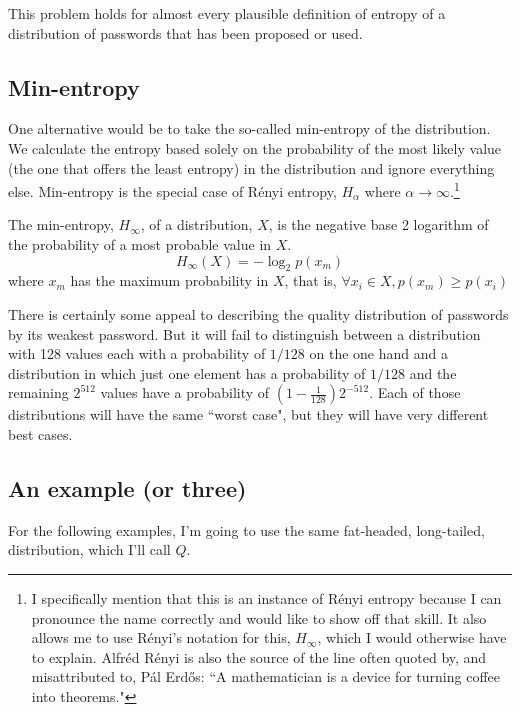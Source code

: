 \documentclass[12pt]{article}
\begin{document}
This problem holds for almost every plausible definition of entropy of a distribution of passwords that has been proposed or used.

\subsection{Min-entropy}

One alternative would be to take the so-called min-entropy of the distribution. We calculate the entropy based solely on the probability of the most likely value (the one that offers the least entropy) in the distribution and ignore everything else.  Min-entropy is the special case of Rényi entropy, $H_\alpha$ where $\alpha \to \infty$.\footnote{I specifically mention that this is an instance of R\'enyi entropy \parencite{Renyi:1960} because I can pronounce the name correctly and would like to show off that skill. It also allows me to use Rényi's notation for this, $H_\infty$, which I would otherwise have to explain. Alfréd Rényi is also the source of the line often quoted by, and misattributed to, Pál Erdős: ``A mathematician is a device for turning coffee into theorems."}

\begin{Definition}\label{def:minH}
The min-entropy, $H_\infty$, of a distribution, $X$, is the negative base 2 logarithm of the probability of a most probable value in $X$.
$$
H_\infty(X) = -\log_2 p(x_m)
$$
where $x_m$ has the maximum probability in $X$, that is, $\forall x_i \in X, p(x_m) \geq p(x_i)$
\end{Definition}

There is certainly some appeal to describing the quality distribution of passwords by its weakest password. But it will fail to distinguish between a distribution with 128 values each with a probability of $1/128$ on the one hand and a distribution in which just one element has a probability of $1/128$ and the remaining $2^{512}$ values have a probability of $(1-\frac{1}{128})2^{-512}$. Each of those distributions will have the same ``worst case", but they will have very different best cases.

\subsection{An example (or three)}\label{sec:examples}

For the following examples, I'm going to use the same fat-headed, long-tailed, distribution, which I'll call $Q$.
\end{document}

